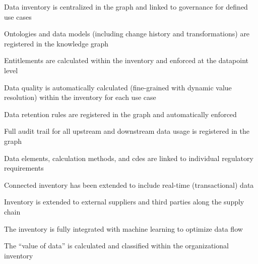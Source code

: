 \kgmmscoringlevelThree

\begin{scoring}

  \item Data inventory is centralized in the graph and linked to governance for defined use cases
  \item Ontologies and data models (including change history and transformations) are registered in the knowledge graph
  \item Entitlements are calculated within the inventory and enforced at the datapoint level
  \item Data quality is automatically calculated (fine-grained with dynamic value resolution) within the inventory
        for each use case
  \item Data retention rules are registered in the graph and automatically enforced
  \item Full audit trail for all upstream and downstream data usage is registered in the graph
  \item Data elements, calculation methods, and \glspl{cde} are linked to individual regulatory requirements

\end{scoring}

\kgmmscoringlevelFour

\begin{scoring}

  \item Connected inventory has been extended to include real-time (transactional) data
  \item Inventory is extended to external suppliers and third parties along the supply chain
  \item The inventory is fully integrated with machine learning to optimize data flow
  \item The “value of data” is calculated and classified within the organizational inventory

\end{scoring}

